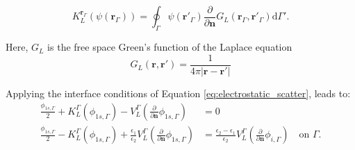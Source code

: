 \begin{equation}\label{eq:double_layer}
K^{\mathbf{r}_\Gamma}_L (\psi(\mathbf{r}_\Gamma)) = \oint_\Gamma \psi(\mathbf{r}'_\Gamma) \frac{\partial}{\partial \mathbf{n}}G_L(\mathbf{r}_\Gamma, \mathbf{r}'_\Gamma) \text{d} \Gamma'.
\end{equation}
%

Here, $G_L$ is the free space Green's function of the Laplace equation
%
\begin{equation}
G_L(\mathbf{r},\mathbf{r}') = \frac{1}{4\pi|\mathbf{r}-\mathbf{r}'|}
\end{equation}

Applying the interface conditions of Equation \eqref{eq:electrostatic_scatter},
leads to:
%
\begin{align} \label{eq:integral_eq_lspr}
\frac{\phi_{1s,\Gamma}}{2}+ K_{L}^{\Gamma}(\phi_{1s,\Gamma}) - V_{L}^{\Gamma} \left(\frac{\partial}{\partial \mathbf{n}}\phi_{1s,\Gamma} \right) &= 0  \nonumber \\
\frac{\phi_{1s,\Gamma}}{2} - K_{L}^{\Gamma}(\phi_{1s,\Gamma}) + \frac{\epsilon_1}{\epsilon_2}V_{L}^{\Gamma} \left( \frac{\partial}{\partial \mathbf{n}} \phi_{1s,\Gamma}  \right) &= \frac{\epsilon_2-\epsilon_1}{\epsilon_2}V_{L}^{\Gamma}\left( \frac{\partial}{\partial \mathbf{n}} \phi_{i,\Gamma} \right)\quad \text{on $\Gamma$.}
\end{align}








